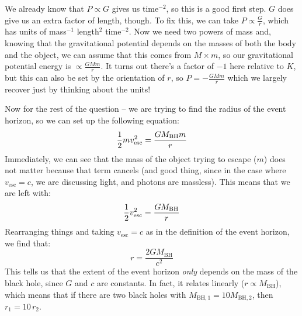 We already know that $P \propto G$ gives us time$^{-2}$, so this is a good first step. $G$ does give us an extra factor of length, though. To fix this, we can take $P \propto \frac{G}{r}$, which has units of mass$^{-1}$ length$^2$ time$^{-2}$. Now we need two powers of mass and, knowing that the gravitational potential depends on the masses of both the body and the object, we can assume that this comes from $M\times m$, so our gravitational potential energy is $\propto \frac{GMm}{r}$. It turns out there's a factor of $-1$ here relative to $K$, but this can also be set by the orientation of $r$, so $P = -\frac{GMm}{r}$ which we largely recover just by thinking about the units!

Now for the rest of the question -- we are trying to find the radius of the event horizon, so we can set up the following equation:
\begin{equation}
    \frac{1}{2} m v_\mathrm{esc}^2 = \frac{G M_\mathrm{BH} m}{r} \notag
\end{equation}
Immediately, we can see that the mass of the object trying to escape ($m$) does not matter because that term cancels (and good thing, since in the case where $v_\mathrm{esc} = c$, we are discussing light, and photons are massless). This means that we are left with:
\begin{equation}
    \frac{1}{2} v_\mathrm{esc}^2 = \frac{GM_\mathrm{BH}}{r} \notag
\end{equation}
Rearranging things and taking $v_\mathrm{esc} = c$ as in the definition of the event horizon, we find that:
\begin{equation}
    r = \frac{2 G M_\mathrm{BH}}{c^2}
\end{equation}
This tells us that the extent of the event horizon \emph{only} depends on the mass of the black hole, since $G$ and $c$ are constants. In fact, it relates linearly ($r \propto M_\mathrm{BH}$), which means that if there are two black holes with $M_\mathrm{BH,1} = 10 M_\mathrm{BH,2}$, then $r_1 = 10\,r_2$.